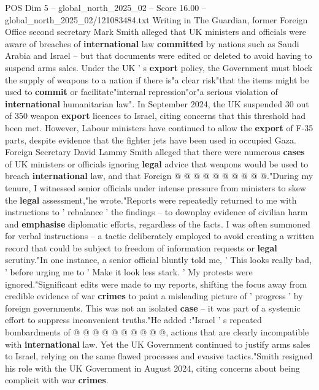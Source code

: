 \begin{textsample}{POS Dim 5 – global\_north\_2025\_02 – Score 16.00 – global\_north\_2025\_02/121083484.txt}  \label{ex:f5_pos_210}
Writing in The Guardian, former Foreign Office second secretary Mark Smith alleged that UK ministers and officials were aware of breaches of \textbf{international} law \textbf{committed} by nations such as Saudi Arabia and Israel -- but that documents were edited or deleted to avoid having to suspend arms sales.
Under the UK ' s \textbf{export} policy, the Government must block the supply of weapons to a nation if there is"a clear risk"that the items might be used to \textbf{commit} or facilitate"internal repression"or"a serious violation of \textbf{international} humanitarian law".
In September 2024, the UK suspended 30 out of 350 weapon \textbf{export} licences to Israel, citing concerns that this threshold had been met.
However, Labour ministers have continued to allow the \textbf{export} of F-35 parts, despite evidence that the fighter jets have been used in occupied Gaza.
Foreign Secretary David Lammy Smith alleged that there were numerous \textbf{cases} of UK ministers or officials ignoring \textbf{legal} advice that weapons would be used to breach \textbf{international} law, and that Foreign @ @ @ @ @ @ @ @ @ @."During my tenure, I witnessed senior officials under intense pressure from ministers to skew the \textbf{legal} assessment,"he wrote."Reports were repeatedly returned to me with instructions to ' rebalance ' the findings -- to downplay evidence of civilian harm and \textbf{emphasise} diplomatic efforts, regardless of the facts.
I was often summoned for verbal instructions -- a tactic deliberately employed to avoid creating a written record that could be subject to freedom of information requests or \textbf{legal} scrutiny."In one instance, a senior official bluntly told me, ' This looks really bad, ' before urging me to ' Make it look less stark. ' My protests were ignored."Significant edits were made to my reports, shifting the focus away from credible evidence of war \textbf{crimes} to paint a misleading picture of ' progress ' by foreign governments.
This was not an isolated \textbf{case} -- it was part of a systemic effort to suppress inconvenient truths."He added :"Israel ' s repeated bombardments of @ @ @ @ @ @ @ @ @ @, actions that are clearly incompatible with \textbf{international} law.
Yet the UK Government continued to justify arms sales to Israel, relying on the same flawed processes and evasive tactics."Smith resigned his role with the UK Government in August 2024, citing concerns about being complicit with war \textbf{crimes}.

\end{textsample}
